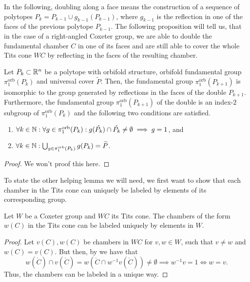 In the following, doubling along a face means the construction of a sequence of polytopes \(P_k = P_{k-1} \cup g_{k-1}(P_{k-1})\), where \(g_{k-1}\) is the reflection in one of the faces of the previous polytope \(P_{k-1}\).
The following proposition will tell us, that in the case of a right-angled Coxeter group, we are able to double the fundamental chamber \(C\) in one of its faces and are still able to cover the whole Tits cone \(WC\) by reflecting in the faces of the resulting chamber.

\begin{proposition}\label{prop:double}
    Let \(P_k \subset \mathbb{R}^n\) be a polytope with orbifold structure, orbifold fundamental group \(\pi_1^{\text{orb}}(P_k)\) and universal cover \(\widetilde{P}\).
    Then, the fundamental group \(\pi_1^{\text{orb}}(P_{k+1})\) is isomorphic to the group generated by reflections in the faces of the double \(P_{k+1}\).
    Furthermore, the fundamental group \(\pi_1^{\text{orb}}(P_{k+1})\) of the double is an index-\(2\) subgroup of \(\pi_1^{\text{orb}}(P_k)\) and the following two conditions are satisfied.
    \begin{enumerate}
        \item \(\forall k \in \mathbb{N}: \forall g \in \pi_1^{\text{orb}}(P_k): g(\mathring{P_k}) \cap \mathring{P_k} \neq \emptyset \implies g = 1\), and
        \item \(\forall k \in \mathbb{N}: \bigcup_{g \in \pi_1^{\text{orb}}(P_k)} g(P_{k}) = \widetilde{P}\).
    \end{enumerate}
\end{proposition}
\begin{proof}
    We won't proof this here.
\end{proof}

To state the other helping lemma we will need, we first want to show that each chamber in the Tits cone can uniquely be labeled by elements of its corresponding group.

\begin{lemma}
    Let \(W\) be a Coxeter group and \(WC\) its Tits cone.
    The chambers of the form \(w(C)\) in the Tits cone can be labeled uniquely by elements in \(W\).
\end{lemma}
\begin{proof}
    Let \(v(C), w(C)\) be chambers in \(WC\) for \(v, w \in W\), such that \(v \neq w\) and \(w(C) = v(C)\).\newline
    But then, by  we have that
    \[w(\mathring{C}) \cap v(\mathring{C}) = w(\mathring{C} \cap w^{-1}v(\mathring{C})) \neq \emptyset \implies w^{-1}v = 1 \iff w = v.\]
    Thus, the chambers can be labeled in a unique way.
\end{proof}

